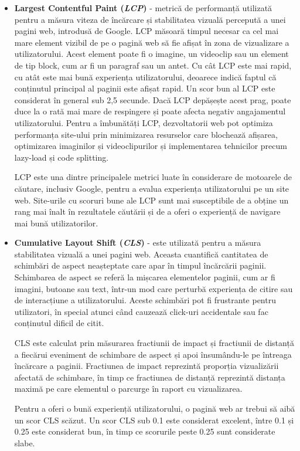 \documentclass[12pt, a4paper]{report}
\begin{document}
\begin{itemize}
	\item \textbf{Largest Contentful Paint (\emph{LCP})} - metrică de performanță utilizată pentru a măsura viteza de încărcare și stabilitatea vizuală percepută a unei pagini web, introdusă de Google. LCP măsoară timpul necesar ca cel mai mare element vizibil de pe o pagină web să fie afișat în zona de vizualizare a utilizatorului. Acest element poate fi o imagine, un videoclip sau un element de tip block, cum ar fi un paragraf sau un antet. Cu cât LCP este mai rapid, cu atât este mai bună experiența utilizatorului, deoarece indică faptul că conținutul principal al paginii este afișat rapid. Un scor bun al LCP este considerat în general sub 2,5 secunde. Dacă LCP depășește acest prag, poate duce la o rată mai mare de respingere și poate afecta negativ angajamentul utilizatorului. Pentru a îmbunătăți LCP, dezvoltatorii web pot optimiza performanța site-ului prin minimizarea resurselor care blochează afișarea, optimizarea imaginilor și videoclipurilor și implementarea tehnicilor precum lazy-load și code splitting.

	      LCP este una dintre principalele metrici luate în considerare de motoarele de căutare, inclusiv Google, pentru a evalua experiența utilizatorului pe un site web. Site-urile cu scoruri bune ale LCP sunt mai susceptibile de a obține un rang mai înalt în rezultatele căutării și de a oferi o experiență de navigare mai bună utilizatorilor.
	\item \textbf{Cumulative Layout Shift (\emph{CLS})} - este utilizată pentru a măsura stabilitatea vizuală a unei pagini web. Aceasta cuantifică cantitatea de schimbări de aspect neașteptate care apar în timpul încărcării paginii. Schimbarea de aspect se referă la mișcarea elementelor paginii, cum ar fi imagini, butoane sau text, într-un mod care perturbă experiența de citire sau de interacțiune a utilizatorului. Aceste schimbări pot fi frustrante pentru utilizatori, în special atunci când cauzează click-uri accidentale sau fac conținutul dificil de citit.

	      CLS este calculat prin măsurarea fractiunii de impact și fractiunii de distanță a fiecărui eveniment de schimbare de aspect și apoi însumându-le pe întreaga încărcare a paginii. Fractiunea de impact reprezintă proporția vizualizării afectată de schimbare, în timp ce fractiunea de distanță reprezintă distanța maximă pe care elementul o parcurge în raport cu vizualizarea.

	      Pentru a oferi o bună experiență utilizatorului, o pagină web ar trebui să aibă un scor CLS scăzut. Un scor CLS sub 0.1 este considerat excelent, între 0.1 și 0.25 este considerat bun, în timp ce scorurile peste 0.25 sunt considerate slabe.


\end{itemize}
\end{document}
